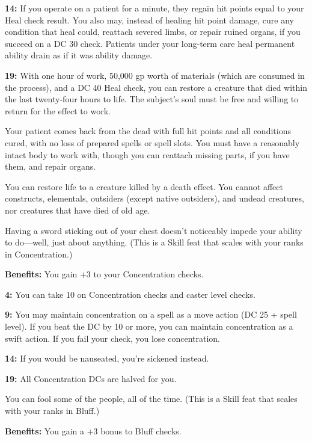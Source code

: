 \textbf{14:} If you operate on a patient for a minute, they regain hit points equal to your Heal check result. You also may, instead of healing hit point damage, cure any condition that heal could, reattach severed limbs, or repair ruined organs, if you succeed on a DC 30 check. Patients under your long-term care heal permanent ability drain as if it was ability damage.

\textbf{19:} With one hour of work, 50,000 gp worth of materials (which are consumed in the process), and a DC 40 Heal check, you can restore a creature that died within the last twenty-four hours to life. The subject's soul must be free and willing to return for the effect to work.

Your patient comes back from the dead with full hit points and all conditions cured, with no loss of prepared spells or spell slots. You must have a reasonably intact body to work with, though you can reattach missing parts, if you have them, and repair organs.

You can restore life to a creature killed by a death effect. You cannot affect constructs, elementals, outsiders (except native outsiders), and undead creatures, nor creatures that have died of old age.


Having a sword sticking out of your chest doesn't noticeably impede your ability to do—well, just about anything. (This is a Skill feat that scales with your ranks in Concentration.)

\textbf{Benefits:} You gain +3 to your Concentration checks.

\textbf{4:} You can take 10 on Concentration checks and caster level checks.

\textbf{9:} You may maintain concentration on a spell as a move action (DC 25 + spell level). If you beat the DC by 10 or more, you can maintain concentration as a swift action. If you fail your check, you lose concentration.

\textbf{14:} If you would be nauseated, you're sickened instead.

\textbf{19:} All Concentration DCs are halved for you.


You can fool some of the people, all of the time. (This is a Skill feat that scales with your ranks in Bluff.)

\textbf{Benefits:} You gain a +3 bonus to Bluff checks.

